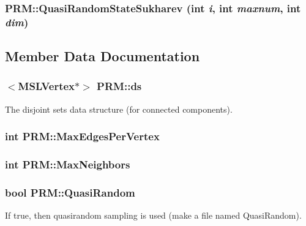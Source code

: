 \subsubsection{ PRM::Quasi\-Random\-State\-Sukharev (int {\em i}, int {\em maxnum}, int {\em dim})\hspace{0.3cm}{\tt  [protected]}}\label{classPRM_b5}




\subsection{Member Data Documentation}
\subsubsection{$<${\bf MSLVertex}$\ast$$>$ PRM::ds}\label{classPRM_m1}


The disjoint sets data structure (for connected components).

\subsubsection{\setlength{\rightskip}{0pt plus 5cm}int PRM::Max\-Edges\-Per\-Vertex\hspace{0.3cm}{\tt  [protected]}}\label{classPRM_n2}


\subsubsection{\setlength{\rightskip}{0pt plus 5cm}int PRM::Max\-Neighbors\hspace{0.3cm}{\tt  [protected]}}\label{classPRM_n1}


\subsubsection{\setlength{\rightskip}{0pt plus 5cm}bool PRM::Quasi\-Random}\label{classPRM_m3}


If true, then quasirandom sampling is used (make a file named Quasi\-Random).

